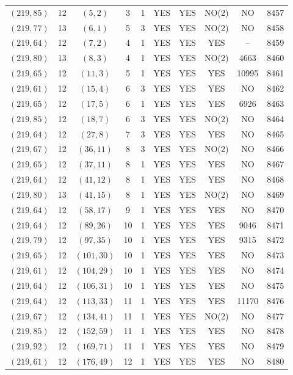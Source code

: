 \begin{longtable}{|c|c|c|c|c|c|c|c|c|c|}
$(219, 85)$ & 12 & $(5, 2)$ & 3 & 1 & YES & YES & NO(2) & NO & 8457\\
$(219, 77)$ & 13 & $(6, 1)$ & 5 & 3 & YES & YES & NO(2) & NO & 8458\\
$(219, 64)$ & 12 & $(7, 2)$ & 4 & 1 & YES & YES & YES & -- & 8459\\
$(219, 80)$ & 13 & $(8, 3)$ & 4 & 1 & YES & YES & NO(2) & 4663 & 8460\\
$(219, 65)$ & 12 & $(11, 3)$ & 5 & 1 & YES & YES & YES & 10995 & 8461\\
$(219, 61)$ & 12 & $(15, 4)$ & 6 & 3 & YES & YES & YES & NO & 8462\\
$(219, 65)$ & 12 & $(17, 5)$ & 6 & 1 & YES & YES & YES & 6926 & 8463\\
$(219, 85)$ & 12 & $(18, 7)$ & 6 & 3 & YES & YES & NO(2) & NO & 8464\\
$(219, 64)$ & 12 & $(27, 8)$ & 7 & 3 & YES & YES & YES & NO & 8465\\
$(219, 67)$ & 12 & $(36, 11)$ & 8 & 3 & YES & YES & NO(2) & NO & 8466\\
$(219, 65)$ & 12 & $(37, 11)$ & 8 & 1 & YES & YES & YES & NO & 8467\\
$(219, 64)$ & 12 & $(41, 12)$ & 8 & 1 & YES & YES & YES & NO & 8468\\
$(219, 80)$ & 13 & $(41, 15)$ & 8 & 1 & YES & YES & NO(2) & NO & 8469\\
$(219, 64)$ & 12 & $(58, 17)$ & 9 & 1 & YES & YES & YES & NO & 8470\\
$(219, 64)$ & 12 & $(89, 26)$ & 10 & 1 & YES & YES & YES & 9046 & 8471\\
$(219, 79)$ & 12 & $(97, 35)$ & 10 & 1 & YES & YES & YES & 9315 & 8472\\
$(219, 65)$ & 12 & $(101, 30)$ & 10 & 1 & YES & YES & YES & NO & 8473\\
$(219, 61)$ & 12 & $(104, 29)$ & 10 & 1 & YES & YES & YES & NO & 8474\\
$(219, 64)$ & 12 & $(106, 31)$ & 10 & 1 & YES & YES & YES & NO & 8475\\
$(219, 64)$ & 12 & $(113, 33)$ & 11 & 1 & YES & YES & YES & 11170 & 8476\\
$(219, 67)$ & 12 & $(134, 41)$ & 11 & 1 & YES & YES & NO(2) & NO & 8477\\
$(219, 85)$ & 12 & $(152, 59)$ & 11 & 1 & YES & YES & YES & NO & 8478\\
$(219, 92)$ & 12 & $(169, 71)$ & 11 & 1 & YES & YES & YES & NO & 8479\\
$(219, 61)$ & 12 & $(176, 49)$ & 12 & 1 & YES & YES & YES & NO & 8480\\

\end{longtable}
